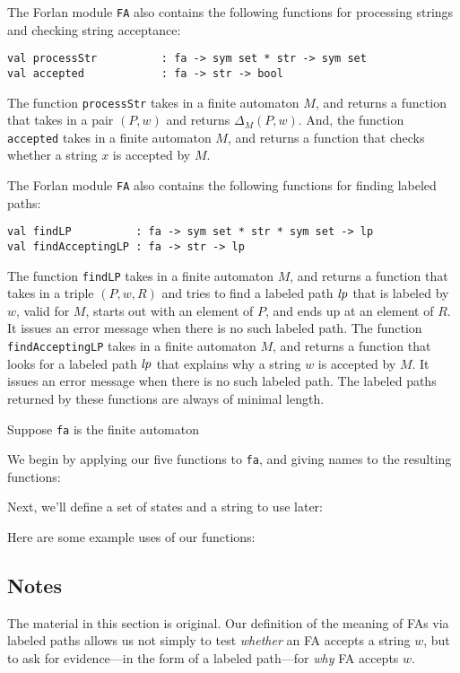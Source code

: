 The Forlan module \texttt{FA}
%
also contains the following functions
for processing strings and checking string acceptance:
\begin{verbatim}
val processStr          : fa -> sym set * str -> sym set
val accepted            : fa -> str -> bool
\end{verbatim}
%
%
The function \texttt{processStr} takes in a finite automaton $M$,
and returns a function that takes in a pair $(P, w)$ and returns
$\Delta_M(P, w)$.
And, the function \texttt{accepted} takes in a finite automaton $M$,
and returns a function that checks whether a string $x$ is
accepted by $M$.

The Forlan module \texttt{FA}
%
also contains the following functions for finding labeled paths:
\begin{verbatim}
val findLP          : fa -> sym set * str * sym set -> lp
val findAcceptingLP : fa -> str -> lp
\end{verbatim}
%
%
The function \texttt{findLP} takes in a finite automaton $M$, and
returns a function that takes in a triple $(P,w,R)$ and tries
to find a labeled path ${\it lp}$ that is labeled by $w$, valid for $M$,
starts out with an element of $P$, and ends up at an element of $R$.
It issues an error message when there is no such labeled path.
The function \texttt{findAcceptingLP} takes in a finite automaton $M$,
and returns a function that looks for a labeled path ${\it lp}$ that
explains why a string $w$ is accepted by $M$.  It issues an error
message when there is no such labeled path.  The labeled paths
returned by these functions are always of minimal length.

Suppose \texttt{fa} is the finite automaton
\begin{center}

\end{center}
We begin by applying our five functions to \texttt{fa}, and giving names
to the resulting functions:

Next, we'll define a set of states and a string to use later:

Here are some example uses of our functions:


\subsection{Notes}

The material in this section is original.  Our definition of the
meaning of FAs via labeled paths allows us not simply to test \emph{whether}
an FA accepts a string $w$, but to ask for evidence---in the form of a
labeled path---for \emph{why} FA accepts $w$.

